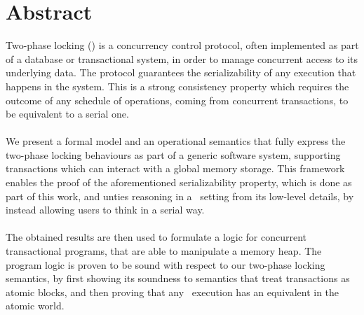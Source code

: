 \vspace*{\fill}
\section*{Abstract}

Two-phase locking (\tpl) is a concurrency control protocol, often implemented as part of a database or transactional system, in order to manage concurrent access to its underlying data. The protocol guarantees the serializability of any execution that happens in the system. This is a strong consistency property which requires the outcome of any schedule of operations, coming from concurrent transactions, to be equivalent to a serial one. \\ \\
We present a formal model and an operational semantics that fully express the two-phase locking behaviours as part of a generic software system, supporting transactions which can interact with a global memory storage. This framework enables the proof of the aforementioned serializability property, which is done as part of this work, and unties  reasoning in a \tpl\ setting from its low-level details, by instead allowing users to think in a serial way. \\ \\
The obtained results are then used to formulate a logic for concurrent transactional programs, that are able to manipulate a memory heap. The program logic is proven to be sound with respect to our two-phase locking semantics, by first showing its soundness to semantics that treat transactions as atomic blocks, and then proving that any \tpl\ execution has an equivalent in the atomic world.
\vspace*{\fill}